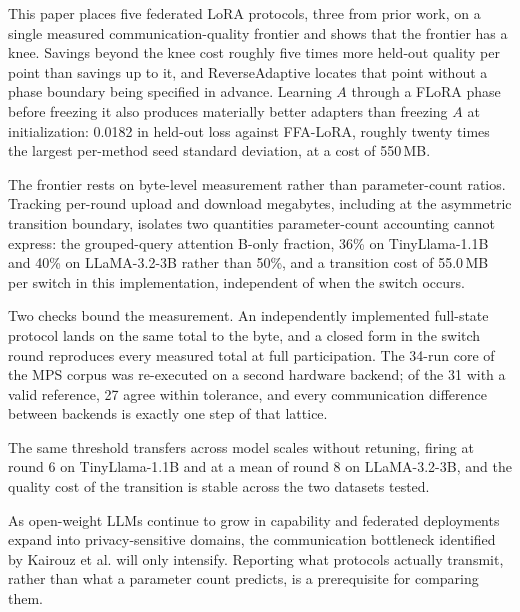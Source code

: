 This paper places five federated LoRA protocols, three from prior work, on a single measured communication-quality frontier and shows that the frontier has a knee. Savings beyond the knee cost roughly five times more held-out quality per point than savings up to it, and ReverseAdaptive locates that point without a phase boundary being specified in advance. Learning $A$ through a FLoRA phase before freezing it also produces materially better adapters than freezing $A$ at initialization: 0.0182 in held-out loss against FFA-LoRA, roughly twenty times the largest per-method seed standard deviation, at a cost of 550\,MB.

The frontier rests on byte-level measurement rather than parameter-count ratios. Tracking per-round upload and download megabytes, including at the asymmetric transition boundary, isolates two quantities parameter-count accounting cannot express: the grouped-query attention B-only fraction, 36\% on TinyLlama-1.1B and 40\% on LLaMA-3.2-3B rather than 50\%, and a transition cost of 55.0\,MB per switch in this implementation, independent of when the switch occurs.

Two checks bound the measurement. An independently implemented full-state protocol lands on the same total to the byte, and a closed form in the switch round reproduces every measured total at full participation. The 34-run core of the MPS corpus was re-executed on a second hardware backend; of the 31 with a valid reference, 27 agree within tolerance, and every communication difference between backends is exactly one step of that lattice.

The same threshold transfers across model scales without retuning, firing at round 6 on TinyLlama-1.1B and at a mean of round 8 on LLaMA-3.2-3B, and the quality cost of the transition is stable across the two datasets tested.

As open-weight LLMs continue to grow in capability and federated deployments expand into privacy-sensitive domains, the communication bottleneck identified by Kairouz et al. \cite{kairouz2021advances} will only intensify. Reporting what protocols actually transmit, rather than what a parameter count predicts, is a prerequisite for comparing them.

